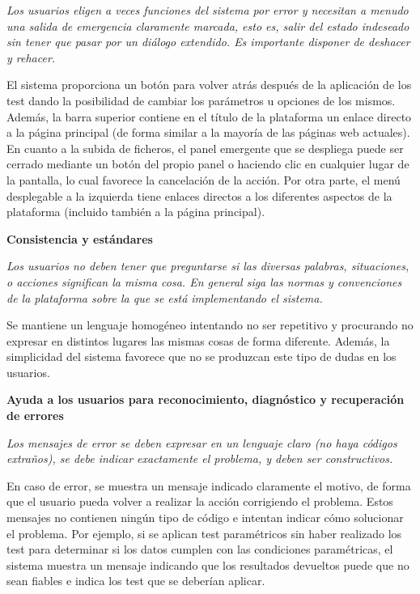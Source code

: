 \textit{Los usuarios eligen a veces funciones del sistema por error y necesitan a menudo una salida de emergencia claramente marcada, esto es, salir del estado indeseado sin tener que pasar por un diálogo extendido. Es importante disponer de deshacer y rehacer.}

El sistema proporciona un botón para volver atrás después de la aplicación de los test dando la posibilidad de cambiar los parámetros u opciones de los mismos. Además, la barra superior contiene en el título de la plataforma un enlace directo a la página principal (de forma similar a la mayoría de las páginas web actuales). En cuanto a la subida de ficheros, el panel emergente que se despliega puede ser cerrado mediante un botón del propio panel o haciendo clic en cualquier lugar de la pantalla, lo cual favorece la cancelación de la acción. Por otra parte, el menú desplegable a la izquierda tiene enlaces directos a los diferentes aspectos de la plataforma (incluido también a la página principal).

\noindent
\textbf{Consistencia y estándares}

\textit{Los usuarios no deben tener que preguntarse si las diversas palabras, situaciones, o acciones significan la misma cosa. En general siga las normas y convenciones de la plataforma sobre la que se está implementando el sistema.}

Se mantiene un lenguaje homogéneo intentando no ser repetitivo y procurando no expresar en distintos lugares las mismas cosas de forma diferente. Además, la simplicidad del sistema favorece que no se produzcan este tipo de dudas en los usuarios.

\noindent
\textbf{Ayuda a los usuarios para reconocimiento, diagnóstico y recuperación de errores}

\textit{Los mensajes de error se deben expresar en un lenguaje claro (no haya códigos extraños), se debe indicar exactamente el problema, y deben ser constructivos.}

En caso de error, se muestra un mensaje indicado claramente el motivo, de forma que el usuario pueda volver a realizar la acción corrigiendo el problema. Estos mensajes no contienen ningún tipo de código e intentan indicar cómo solucionar el problema. Por ejemplo, si se aplican test paramétricos sin haber realizado los test para determinar si los datos cumplen con las condiciones paramétricas, el sistema muestra un mensaje indicando que los resultados devueltos puede que no sean fiables e indica los test que se deberían aplicar.

